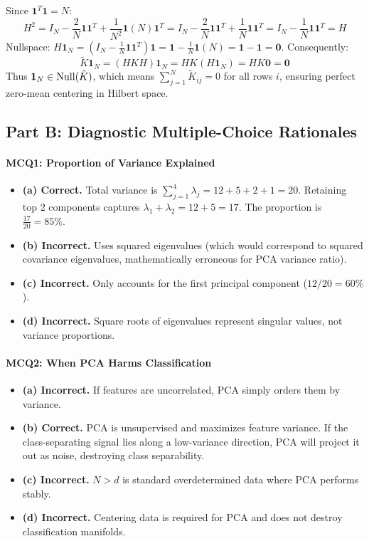 \begin{enumerate}[label=(\alph*)]
\[    \]
    Since $\mathbf{1}^T \mathbf{1} = N$:
    \[
    H^2 = I_N - \frac{2}{N}\mathbf{1}\mathbf{1}^T + \frac{1}{N^2}\mathbf{1}(N)\mathbf{1}^T = I_N - \frac{2}{N}\mathbf{1}\mathbf{1}^T + \frac{1}{N}\mathbf{1}\mathbf{1}^T = I_N - \frac{1}{N}\mathbf{1}\mathbf{1}^T = H
    \]
    Nullspace: $H \mathbf{1}_N = (I_N - \frac{1}{N}\mathbf{1}\mathbf{1}^T)\mathbf{1} = \mathbf{1} - \frac{1}{N}\mathbf{1}(N) = \mathbf{1} - \mathbf{1} = \mathbf{0}$.
    Consequently:
    \[
    \tilde{K} \mathbf{1}_N = (H K H)\mathbf{1}_N = H K (H \mathbf{1}_N) = H K \mathbf{0} = \mathbf{0}
    \]
    Thus $\mathbf{1}_N \in \operatorname{Null}(\tilde{K})$, which means $\sum_{j=1}^N \tilde{K}_{ij} = 0$ for all rows $i$, ensuring perfect zero-mean centering in Hilbert space.
\end{enumerate}

\subsection*{Part B: Diagnostic Multiple-Choice Rationales}

\paragraph{MCQ1: Proportion of Variance Explained}
\begin{itemize}
    \item \textbf{(a) Correct.} Total variance is $\sum_{j=1}^4 \lambda_j = 12 + 5 + 2 + 1 = 20$. Retaining top 2 components captures $\lambda_1 + \lambda_2 = 12 + 5 = 17$. The proportion is $\frac{17}{20} = 85\%$.
    \item \textbf{(b) Incorrect.} Uses squared eigenvalues (which would correspond to squared covariance eigenvalues, mathematically erroneous for PCA variance ratio).
    \item \textbf{(c) Incorrect.} Only accounts for the first principal component ($12/20 = 60\%$).
    \item \textbf{(d) Incorrect.} Square roots of eigenvalues represent singular values, not variance proportions.
\end{itemize}

\paragraph{MCQ2: When PCA Harms Classification}
\begin{itemize}
    \item \textbf{(a) Incorrect.} If features are uncorrelated, PCA simply orders them by variance.
    \item \textbf{(b) Correct.} PCA is unsupervised and maximizes feature variance. If the class-separating signal lies along a low-variance direction, PCA will project it out as noise, destroying class separability.
    \item \textbf{(c) Incorrect.} $N > d$ is standard overdetermined data where PCA performs stably.
    \item \textbf{(d) Incorrect.} Centering data is required for PCA and does not destroy classification manifolds.
\end{itemize}


